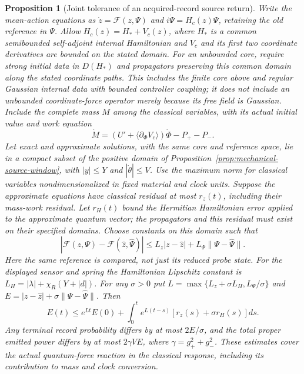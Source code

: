 \documentclass[12pt,a4paper]{article}
\newtheorem{proposition}[theorem]{Proposition}
\begin{document}
\begin{proposition}[Joint tolerance of an acquired-record source return]
\label{prop:coupled-return-tolerance}
Write the mean-action equations as
$\dot z=\mathcal F(z,\Psi)$ and $i\dot\Psi=H_c(z)\Psi$,
retaining the old reference in $\Psi$.
Allow $H_c(z)=H_*+V_c(z)$, where $H_*$ is a common semibounded self-adjoint
internal Hamiltonian and $V_c$ and its first two coordinate derivatives
are bounded on the stated domain. For an unbounded core, require strong
initial data in $D(H_*)$ and propagators preserving this common domain
along the stated coordinate paths. This includes the finite core above
and regular Gaussian internal data with bounded controller coupling;
it does not include an unbounded coordinate-force operator merely
because its free field is Gaussian. Include the complete mass $M$
among the classical variables,
with its actual initial value and work equation
\[
 \dot M=(U'+\langle\partial_\Phi V_c\rangle)\dot\Phi-P_+-P_-.
\]
Let exact and approximate solutions, with the same core and
reference space, lie in a compact subset of the positive domain of
Proposition~\ref{prop:mechanical-source-window}, with
$|y|\le Y$ and $|\dot\theta|\le V$.
Use the maximum norm for classical variables nondimensionalized in
fixed material and clock units. Suppose the
approximate equations have classical residual at most $r_z(t)$,
including their mass-work residual. Let $r_H(t)$ bound the Hermitian
Hamiltonian error applied to the approximate quantum vector; the
propagators and this residual must exist on their specified domains.
Choose constants on this domain such that
\[
 |\mathcal F(z,\Psi)-\mathcal F(\widehat z,\widehat\Psi)|
 \le L_z|z-\widehat z|+L_\Psi\|\Psi-\widehat\Psi\|.
\]
Here the same reference is compared, not just its reduced probe state.
For the displayed sensor and spring the Hamiltonian Lipschitz constant is
$L_H=|\lambda|+\chi_R(Y+|d|)$.
For any $\sigma>0$ put
$L=\max\{L_z+\sigma L_H,L_\Psi/\sigma\}$ and
$E=|z-\widehat z|+\sigma\|\Psi-\widehat\Psi\|$.
Then
\begin{equation}
 E(t)\le e^{Lt}E(0)+\int_0^t e^{L(t-s)}
                   [r_z(s)+\sigma r_H(s)]ds.
 \label{eq:coupled-return-error}
\end{equation}
Any terminal record probability differs by at most $2E/\sigma$,
and the total proper emitted power differs by at most $2\gamma VE$,
where $\gamma=g_+^2+g_-^2$.
These estimates cover the actual quantum-force reaction in the classical
response, including its contribution to mass and clock conversion.
\end{proposition}
\end{document}
